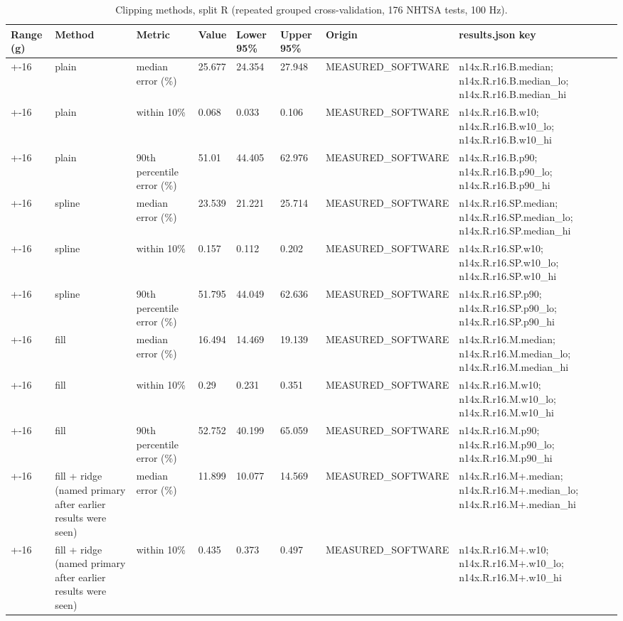 \begin{table}[t]
\centering
\small
\caption{Clipping methods, split R (repeated grouped cross-validation, 176 NHTSA tests, 100 Hz).}
\label{tab:tab_clipping_methods}
\begin{tabular}{llllllll}
\toprule
Range (g) & Method & Metric & Value & Lower 95\% & Upper 95\% & Origin & results.json key \\
\midrule
+-16 & plain & median error (\%) & 25.677 & 24.354 & 27.948 & MEASURED\_SOFTWARE & n14x.R.r16.B.median; n14x.R.r16.B.median\_lo; n14x.R.r16.B.median\_hi \\
+-16 & plain & within 10\% & 0.068 & 0.033 & 0.106 & MEASURED\_SOFTWARE & n14x.R.r16.B.w10; n14x.R.r16.B.w10\_lo; n14x.R.r16.B.w10\_hi \\
+-16 & plain & 90th percentile error (\%) & 51.01 & 44.405 & 62.976 & MEASURED\_SOFTWARE & n14x.R.r16.B.p90; n14x.R.r16.B.p90\_lo; n14x.R.r16.B.p90\_hi \\
+-16 & spline & median error (\%) & 23.539 & 21.221 & 25.714 & MEASURED\_SOFTWARE & n14x.R.r16.SP.median; n14x.R.r16.SP.median\_lo; n14x.R.r16.SP.median\_hi \\
+-16 & spline & within 10\% & 0.157 & 0.112 & 0.202 & MEASURED\_SOFTWARE & n14x.R.r16.SP.w10; n14x.R.r16.SP.w10\_lo; n14x.R.r16.SP.w10\_hi \\
+-16 & spline & 90th percentile error (\%) & 51.795 & 44.049 & 62.636 & MEASURED\_SOFTWARE & n14x.R.r16.SP.p90; n14x.R.r16.SP.p90\_lo; n14x.R.r16.SP.p90\_hi \\
+-16 & fill & median error (\%) & 16.494 & 14.469 & 19.139 & MEASURED\_SOFTWARE & n14x.R.r16.M.median; n14x.R.r16.M.median\_lo; n14x.R.r16.M.median\_hi \\
+-16 & fill & within 10\% & 0.29 & 0.231 & 0.351 & MEASURED\_SOFTWARE & n14x.R.r16.M.w10; n14x.R.r16.M.w10\_lo; n14x.R.r16.M.w10\_hi \\
+-16 & fill & 90th percentile error (\%) & 52.752 & 40.199 & 65.059 & MEASURED\_SOFTWARE & n14x.R.r16.M.p90; n14x.R.r16.M.p90\_lo; n14x.R.r16.M.p90\_hi \\
+-16 & fill + ridge (named primary after earlier results were seen) & median error (\%) & 11.899 & 10.077 & 14.569 & MEASURED\_SOFTWARE & n14x.R.r16.M+.median; n14x.R.r16.M+.median\_lo; n14x.R.r16.M+.median\_hi \\
+-16 & fill + ridge (named primary after earlier results were seen) & within 10\% & 0.435 & 0.373 & 0.497 & MEASURED\_SOFTWARE & n14x.R.r16.M+.w10; n14x.R.r16.M+.w10\_lo; n14x.R.r16.M+.w10\_hi \\

\end{tabular}
\end{table}
